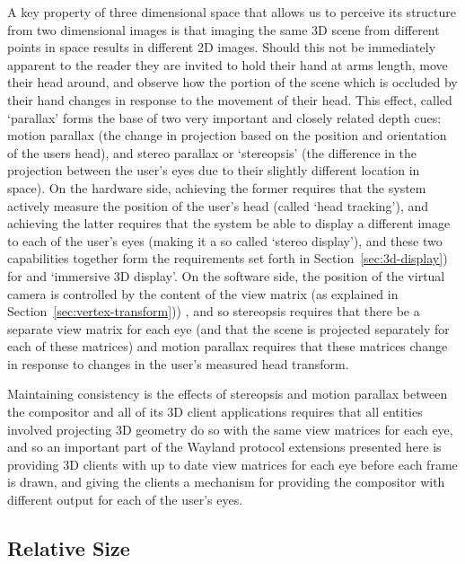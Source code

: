 A key property of three dimensional space that allows us to perceive its structure from two dimensional images is that imaging the same 3D scene from different points in space results in different 2D images. Should this not be immediately apparent to the reader they are invited to hold their hand at arms length, move their head around, and observe how the portion of the scene which is occluded by their hand changes in response to the movement of their head. This effect, called ‘parallax’ forms the base of two very important and closely related depth cues: motion parallax (the change in projection based on the position and orientation of the users head), and stereo parallax or ‘stereopsis’ (the difference in the projection between the user’s eyes due to their slightly different location in space). On the hardware side, achieving the former requires that the system actively measure the position of the user’s head (called ‘head tracking’), and achieving the latter requires that the system be able to display a different image to each of the user’s eyes (making it a so called ‘stereo display’), and these two capabilities together form the requirements set forth in Section~\ref{sec:3d-display}) for and ‘immersive 3D display’. On the software side, the position of the virtual camera is controlled by the content of the view matrix (as explained in Section~\ref{sec:vertex-transform})) , and so stereopsis requires that there be a separate view matrix for each eye (and that the scene is projected separately for each of these matrices) and motion parallax requires that these matrices change in response to changes in the user’s measured head transform.

Maintaining consistency is the effects of stereopsis and motion parallax between the compositor and all of its 3D client applications requires that all entities involved projecting 3D geometry do so with the same view matrices for each eye, and so an important part of the Wayland protocol extensions presented here is providing 3D clients with up to date view matrices for each eye before each frame is drawn, and giving the clients a mechanism for providing the compositor with different output for each of the user’s eyes.

\subsection{Relative Size}

